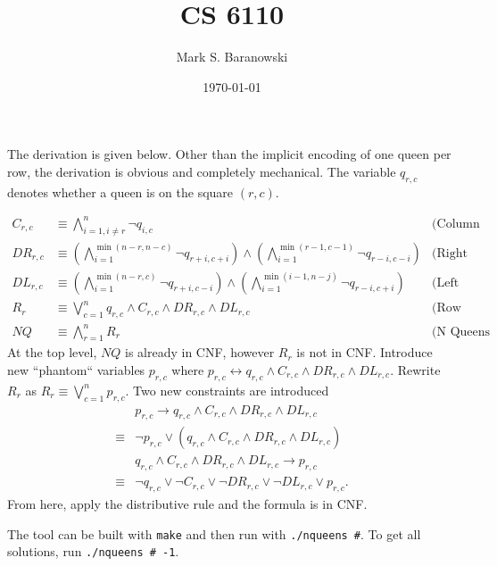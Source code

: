 \documentclass[paper=a4, fontsize=11pt]{scrartcl} %
\title{	
\normalfont \normalsize 
\textsc{CS 6110} \\ %
}
\author{Mark S. Baranowski} %
\date{\normalsize\today} %
\numberwithin{equation}{section} %
\numberwithin{figure}{section} %
\numberwithin{table}{section} %
\begin{document}
\maketitle %

The derivation is given below. Other than the implicit encoding of one queen per row, the derivation is obvious and completely mechanical. The variable $q_{r,c}$ denotes whether a queen is on the square $(r,c)$.

\begin{align*}
C_{r,c} & \equiv \bigwedge_{i=1, i \ne r}^n \neg q_{i,c} & \text{(Column constraint)}\\
DR_{r,c} & \equiv \left(\bigwedge_{i=1}^{\min(n-r, n-c)}\neg q_{r+i, c+i}\right) \wedge
\left( \bigwedge_{i=1}^{\min(r-1,c-1)}\neg q_{r-i, c-i} \right)
 & \text{(Right diagonal constraint)}\\
DL_{r,c} & \equiv \left(\bigwedge_{i=1}^{\min(n-r, c)}\neg q_{r+i, c-i}\right)\wedge
\left(\bigwedge_{i=1}^{\min(i-1,n-j)}\neg q_{r-i,c+i}\right) 
& \text{(Left diagonal constraint)}\\
R_{r} &\equiv \bigvee_{c=1}^n q_{r,c} \wedge C_{r,c}\wedge DR_{r,c} \wedge DL_{r,c} 
&\text{(Row constraint)}\\
NQ &\equiv \bigwedge_{r=1}^nR_r & \text{(N Queens constraint)}
\end{align*}
At the top level, $NQ$ is already in CNF, however $R_r$ is not in CNF. Introduce new ``phantom`` variables $p_{r,c}$ where
$p_{r,c}\leftrightarrow q_{r,c} \wedge C_{r,c}\wedge DR_{r,c} \wedge DL_{r,c}.$
Rewrite $R_r$ as $R_r \equiv \bigvee_{c=1}^n p_{r,c}.$
Two new constraints are introduced
\begin{align*}
&p_{r,c} \rightarrow q_{r,c} \wedge C_{r,c} \wedge DR_{r,c} \wedge DL_{r,c}\\
\equiv&\neg p_{r,c} \vee (q_{r,c} \wedge C_{r,c} \wedge DR_{r,c} \wedge DL_{r,c})\\
&q_{r,c} \wedge C_{r,c} \wedge DR_{r,c} \wedge DL_{r,c}\rightarrow p_{r,c}\\
\equiv&\neg q_{r,c} \vee \neg C_{r,c} \vee \neg DR_{r,c} \vee \neg DL_{r,c} \vee p_{r,c}.
\end{align*}
From here, apply the distributive rule and the formula is in CNF.

The tool can be built with {\tt make} and then run with {\tt ./nqueens \#}. To get all solutions, run {\tt ./nqueens \# -1}.
\end{document}

